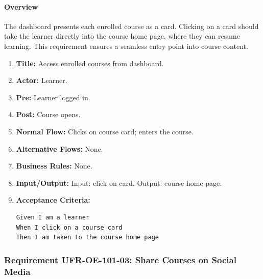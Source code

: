 \paragraph{Overview}
The dashboard presents each enrolled course as a card. Clicking on a card should take the learner directly into the course home page, where they can resume learning. This requirement ensures a seamless entry point into course content.
\begin{enumerate}[label=\textbf{\arabic*.}]
\item \textbf{Title:} Access enrolled courses from dashboard.
\item \textbf{Actor:} Learner.
\item \textbf{Pre:} Learner logged in.
\item \textbf{Post:} Course opens.
\item \textbf{Normal Flow:} Clicks on course card; enters the course.
\item \textbf{Alternative Flows:} None.
\item \textbf{Business Rules:} None.
\item \textbf{Input/Output:} Input: click on card. Output: course home page.
\item \textbf{Acceptance Criteria:}
    \begin{verbatim}
Given I am a learner
When I click on a course card
Then I am taken to the course home page
    \end{verbatim}
\end{enumerate}

\subsubsection{Requirement UFR-OE-101-03: Share Courses on Social Media}
